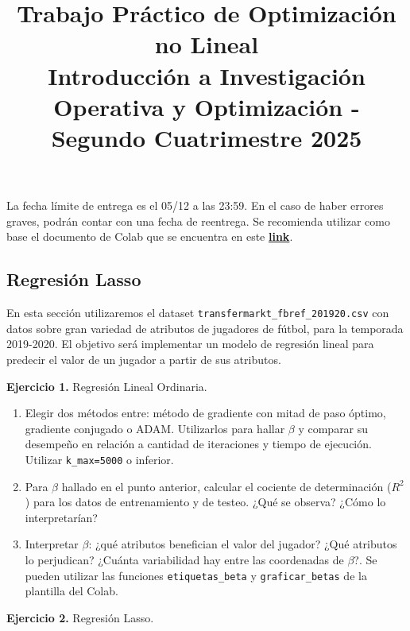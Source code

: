 \documentclass{article}
\title{Trabajo Práctico de Optimización no Lineal \\
\large Introducción a Investigación Operativa y Optimización - Segundo Cuatrimestre 2025}
\author{}
\date{}
\begin{document}
    \maketitle

    La fecha límite de entrega es el 05/12 a las 23:59. En el caso de haber errores graves,
        podrán contar con una fecha de reentrega. Se recomienda utilizar como base el documento de Colab que se
        encuentra en este
        \href{https://colab.research.google.com/drive/1c-Ume72H4fAdg0eKE0YiovByL9ZI_Dxh?usp=sharing}{\textbf{link}}.

    \vspace*{\baselineskip}

    \subsection*{Regresión Lasso}

    En esta sección utilizaremos el dataset \texttt{transfermarkt\_fbref\_201920.csv} con datos sobre gran variedad
    de atributos de jugadores de fútbol, para la temporada 2019-2020. El objetivo será implementar un modelo de
    regresión lineal para predecir el valor de un jugador a partir de sus atributos.

    \textbf{Ejercicio 1.}
    Regresión Lineal Ordinaria.
    \begin{enumerate}
        \item Elegir dos métodos entre: método de gradiente con mitad de paso óptimo, gradiente conjugado o ADAM.
        Utilizarlos para hallar $\beta$ y comparar su desempeño en relación a cantidad de iteraciones y tiempo de
        ejecución. Utilizar \texttt{k\_max=5000} o inferior.
        \item Para $\beta$ hallado en el punto anterior, calcular el cociente de determinación ($R^2$) para los datos
        de entrenamiento y de testeo. ¿Qué se observa? ¿Cómo lo interpretarían?
        \item Interpretar $\beta$: ¿qué atributos benefician el valor del jugador? ¿Qué atributos lo perjudican?
        ¿Cuánta variabilidad hay entre las coordenadas de $\beta$?. Se pueden utilizar las
        funciones \texttt{etiquetas\_beta} y \texttt{graficar\_betas} de la plantilla del Colab.
    \end{enumerate}

    \textbf{Ejercicio 2.} Regresión Lasso.
\end{document}
